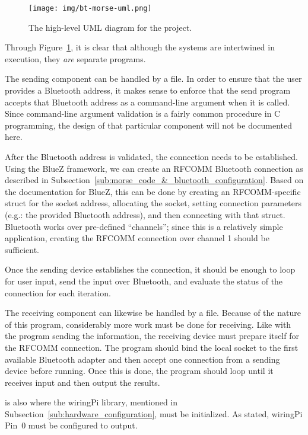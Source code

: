 \documentclass[11pt]{article}
\begin{document}
\begin{figure}[ht]
    \centering
    \texttt{[image: img/bt-morse-uml.png]}
    \caption{The high-level UML diagram for the project.}
    \label{fig:bt-morse-uml}
\end{figure}


Through Figure~\ref{fig:bt-morse-uml}, it is clear that although the systems are intertwined in execution, they \emph{are} separate programs.


The sending component can be handled by a  file.
In order to ensure that the user provides a Bluetooth address, it makes sense to enforce that the send program accepts that Bluetooth address as a command-line argument when it is called.
Since command-line argument validation is a fairly common procedure in C programming, the design of that particular component will not be documented here.


After the Bluetooth address is validated, the connection needs to be established.
Using the BlueZ framework, we can create an RFCOMM Bluetooth connection as described in Subsection~\ref{sub:morse_code_&_bluetooth_configuration}.
Based on the documentation for BlueZ, this can be done by creating an RFCOMM-specific struct for the socket address, allocating the socket, setting connection parameters (e.g.: the provided Bluetooth address), and then connecting with that struct.
Bluetooth works over pre-defined ``channels''; since this is a relatively simple application, creating the RFCOMM connection over channel 1 should be sufficient.


Once the sending device establishes the connection, it should be enough to loop for user input, send the input over Bluetooth, and evaluate the status of the connection for each iteration.


The receiving component can likewise be handled by a  file.
Because of the nature of this program, considerably more work must be done for receiving.
Like with the program sending the information, the receiving device must prepare itself for the RFCOMM connection.
The program should bind the local socket to the first available Bluetooth adapter and then accept one connection from a sending device before running.
Once this is done, the program should loop until it receives input and then output the results.


 is also where the wiringPi library, mentioned in Subsection~\ref{sub:hardware_configuration}, must be initialized.
As stated, wiringPi Pin~0 must be configured to output.
\end{document}
